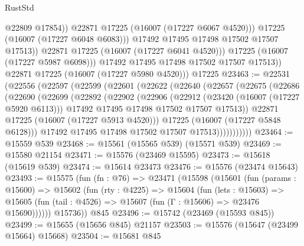 \begin{lexlean}{RustStd}
\begin{coremodule}
                          @22809
                          @17854))
                      @22871
                      @17225
                      (@16007 (@17227 @6067 @4520)))
                    @17225
                    (@16007 (@17227 @6048 @6083)))
                  @17492
                  @17495
                  @17498
                  @17502
                  @17507
                  @17513))
              @22871
              @17225
              (@16007 (@17227 @6041 @4520)))
            @17225
            (@16007 (@17227 @5987 @6098)))
          @17492
          @17495
          @17498
          @17502
          @17507
          @17513))
      @22871
      @17225
      (@16007 (@17227 @5980 @4520)))
    @17225
@23463 := @22531
    (@22556
      (@22597
        (@22599
          (@22601
            (@22622
              (@22640
                (@22657
                  (@22675
                    (@22686
                      (@22690
                        (@22699
                          (@22892
                            (@22902
                              (@22906
                                (@22912
                                  (@23420 (@16007 (@17227 @5920 @6113)))
                                  @17492
                                  @17495
                                  @17498
                                  @17502
                                  @17507
                                  @17513))
                              @22871
                              @17225
                              (@16007 (@17227 @5913 @4520)))
                            @17225
                            (@16007 (@17227 @5848 @6128)))
                          @17492
                          @17495
                          @17498
                          @17502
                          @17507
                          @17513)))))))))))
@23464 := @15559 @539
@23468 := @15561 (@15565 @539) (@15571 @539)
@23469 := @15580 @21154
@23471 := @15576 (@23469 @15595)
@23473 := @15618 (@15619 @539)
@23474 := @15614 @23473
@23476 := @15576 (@23474 @15643)
@23493 := @15575
    (fun (fn : @76) =>
    @23471
      (@15598
        (@15601
          (fun (params : @15600) =>
          @15602
            (fun (rty : @4225) =>
            @15604
              (fun (lets : @15603) =>
              @15605 (fun (tail : @4526) => @15607 (fun (Γ : @15606) => @23476 @15690))))))
        @15736))
    @845
@23496 := @15742 (@23469 (@15593 @845))
@23499 := @15655 (@15656 @845) @21157
@23503 := @15576 (@15647 (@23499 @15664) @15668)
@23504 := @15681 @845

\end{coremodule}
\end{lexlean}
